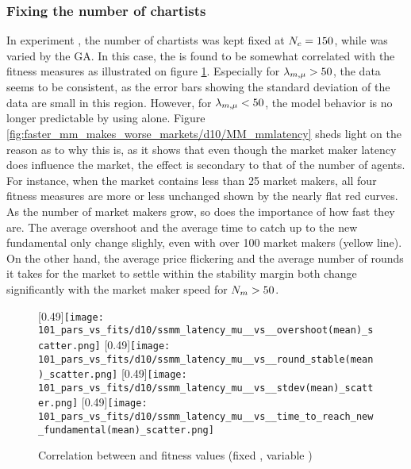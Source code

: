 \subsubsection*{Fixing the number of chartists}
In experiment \dten, the number of chartists was kept fixed at $N_{c} = 150$, while \ssmmnAgents was varied by the GA. In this case, the \ssmmlatencymu is found to be somewhat correlated with the fitness measures as illustrated on figure \ref{fig:d10_parvfit_ssmmlatencymu}. Especially for $\lambda_{m, \mu} > 50$, the data seems to be consistent, as the error bars showing the standard deviation of the data are small in this region. However, for $\lambda_{m, \mu} < 50$, the model behavior is no longer predictable by using \ssmmlatencymu alone. Figure \ref{fig:faster_mm_makes_worse_markets/d10/MM_mmlatency} sheds light on the reason as to why this is, as it shows that even though the market maker latency does influence the market, the effect is secondary to that of the number of agents. For instance, when the market contains less than 25 market makers, all four fitness measures are more or less unchanged shown by the nearly flat red curves. As the number of market makers grow, so does the importance of how fast they are. The average overshoot and the average time to catch up to the new fundamental only change slighly, even with over 100 market makers (yellow line). On the other hand, the average price flickering and the average number of rounds it takes for the market to settle within the stability margin both change significantly with the market maker speed for $N_{m} > 50$.

\begin{figure}
	\centering
	[0.49\linewidth]{\texttt{[image: 101\_pars\_vs\_fits/d10/ssmm\_latency\_mu\_\_vs\_\_overshoot(mean)\_scatter.png]}}
	[0.49\linewidth]{\texttt{[image: 101\_pars\_vs\_fits/d10/ssmm\_latency\_mu\_\_vs\_\_round\_stable(mean)\_scatter.png]}}
	[0.49\linewidth]{\texttt{[image: 101\_pars\_vs\_fits/d10/ssmm\_latency\_mu\_\_vs\_\_stdev(mean)\_scatter.png]}}
	[0.49\linewidth]{\texttt{[image: 101\_pars\_vs\_fits/d10/ssmm\_latency\_mu\_\_vs\_\_time\_to\_reach\_new\_fundamental(mean)\_scatter.png]}}
	\caption{Correlation between \ssmmlatencymu{} and fitness values (fixed \scnAgents, variable \ssmmnAgents)}
	\label{fig:d10_parvfit_ssmmlatencymu}
\end{figure}

